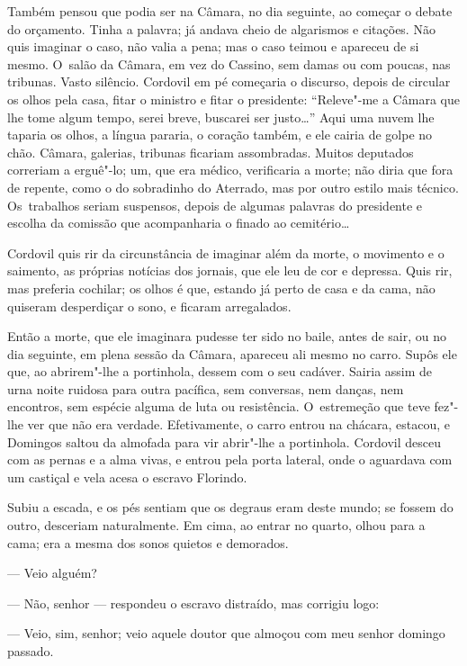 \begin{linenumbers}
Também pensou que podia ser na Câmara, no dia seguinte, ao começar o
debate do orçamento. Tinha a palavra; já andava cheio de algarismos e
citações. Não quis imaginar o caso, não valia a pena; mas o caso teimou
e apareceu de si mesmo. O~salão da Câmara, em vez do Cassino, sem damas
ou com poucas, nas tribunas. Vasto silêncio. Cordovil em pé começaria o
discurso, depois de circular os olhos pela casa, fitar o ministro e
fitar o presidente: ``Releve"-me a Câmara que lhe tome algum tempo, serei
breve, buscarei ser justo\ldots{}'' Aqui uma nuvem lhe taparia os olhos, a
língua pararia, o coração também, e ele cairia de golpe no chão. Câmara,
galerias, tribunas ficariam assombradas. Muitos deputados correriam a
erguê"-lo; um, que era médico, verificaria a morte; não diria que fora de
repente, como o do sobradinho do Aterrado, mas por outro estilo mais
técnico. Os~trabalhos seriam suspensos, depois de algumas palavras do
presidente e escolha da comissão que acompanharia o finado ao
cemitério\ldots{}

Cordovil quis rir da circunstância de imaginar além da morte, o
movimento e o saimento, as próprias notícias dos jornais, que ele leu de
cor e depressa. Quis rir, mas preferia cochilar; os olhos é que, estando
já perto de casa e da cama, não quiseram desperdiçar o sono, e ficaram
arregalados.

Então a morte, que ele imaginara pudesse ter sido no baile, antes de
sair, ou no dia seguinte, em plena sessão da Câmara, apareceu ali mesmo
no carro. Supôs ele que, ao abrirem"-lhe a portinhola, dessem com o seu
cadáver. Sairia assim de urna noite ruidosa para outra pacífica, sem
conversas, nem danças, nem encontros, sem espécie alguma de luta ou
resistência. O~estremeção que teve fez"-lhe ver que não era verdade.
Efetivamente, o carro entrou na chácara, estacou, e Domingos saltou da
almofada para vir abrir"-lhe a portinhola. Cordovil desceu com as pernas
e a alma vivas, e entrou pela porta lateral, onde o aguardava com um
castiçal e vela acesa o escravo Florindo.

Subiu a escada, e os pés sentiam que os degraus eram deste mundo; se
fossem do outro, desceriam naturalmente. Em cima, ao entrar no quarto,
olhou para a cama; era a mesma dos sonos quietos e demorados.

--- Veio alguém?

--- Não, senhor --- respondeu o escravo distraído, mas corrigiu logo:

--- Veio, sim, senhor; veio aquele doutor que almoçou com meu senhor
domingo passado.


\end{linenumbers}
